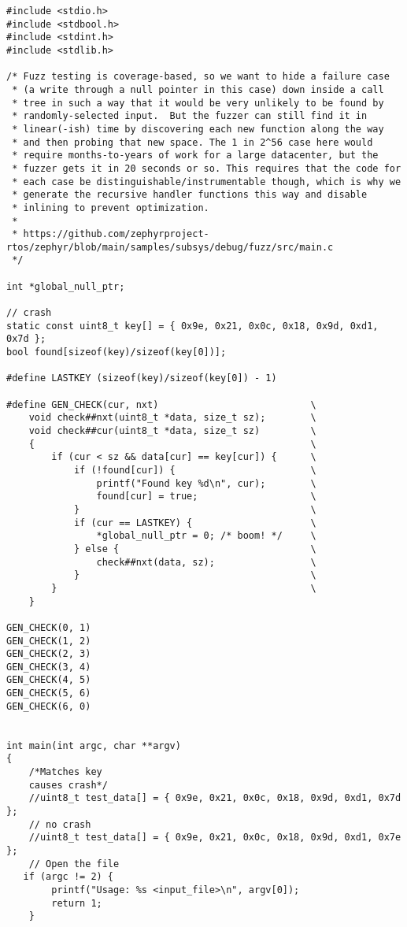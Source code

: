 \begin{verbatim}
#include <stdio.h>
#include <stdbool.h>
#include <stdint.h>
#include <stdlib.h>

/* Fuzz testing is coverage-based, so we want to hide a failure case
 * (a write through a null pointer in this case) down inside a call
 * tree in such a way that it would be very unlikely to be found by
 * randomly-selected input.  But the fuzzer can still find it in
 * linear(-ish) time by discovering each new function along the way
 * and then probing that new space. The 1 in 2^56 case here would
 * require months-to-years of work for a large datacenter, but the
 * fuzzer gets it in 20 seconds or so. This requires that the code for
 * each case be distinguishable/instrumentable though, which is why we
 * generate the recursive handler functions this way and disable
 * inlining to prevent optimization.
 *
 * https://github.com/zephyrproject-rtos/zephyr/blob/main/samples/subsys/debug/fuzz/src/main.c
 */

int *global_null_ptr;

// crash
static const uint8_t key[] = { 0x9e, 0x21, 0x0c, 0x18, 0x9d, 0xd1, 0x7d };
bool found[sizeof(key)/sizeof(key[0])];

#define LASTKEY (sizeof(key)/sizeof(key[0]) - 1)

#define GEN_CHECK(cur, nxt)                           \
    void check##nxt(uint8_t *data, size_t sz);        \
    void check##cur(uint8_t *data, size_t sz)         \
    {                                                 \
        if (cur < sz && data[cur] == key[cur]) {      \
            if (!found[cur]) {                        \
                printf("Found key %d\n", cur);        \
                found[cur] = true;                    \
            }                                         \
            if (cur == LASTKEY) {                     \
                *global_null_ptr = 0; /* boom! */     \
            } else {                                  \
                check##nxt(data, sz);                 \
            }                                         \
        }                                             \
    }

GEN_CHECK(0, 1)
GEN_CHECK(1, 2)
GEN_CHECK(2, 3)
GEN_CHECK(3, 4)
GEN_CHECK(4, 5)
GEN_CHECK(5, 6)
GEN_CHECK(6, 0)


int main(int argc, char **argv)
{
    /*Matches key
    causes crash*/
    //uint8_t test_data[] = { 0x9e, 0x21, 0x0c, 0x18, 0x9d, 0xd1, 0x7d };
    // no crash
    //uint8_t test_data[] = { 0x9e, 0x21, 0x0c, 0x18, 0x9d, 0xd1, 0x7e };
    // Open the file
   if (argc != 2) {
        printf("Usage: %s <input_file>\n", argv[0]);
        return 1;
    }


\end{verbatim}
